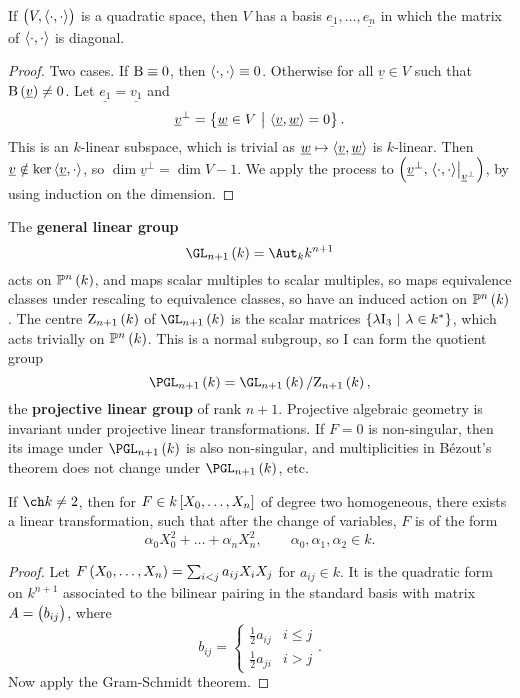 \begin{theorem}
If $ \br{V, \abr{\cdot, \cdot}} $ is a quadratic space, then $ V $ has a basis $ \underline{e_1}, \dots, \underline{e_n} $ in which the matrix of $ \left\langle \cdot, \cdot \right\rangle $ is diagonal.
\end{theorem}

\begin{proof}
Two cases. If $ \mathrm{B} \equiv 0 $, then $ \left\langle \cdot, \cdot \right\rangle \equiv 0 $. Otherwise for all $ \underline{v} \in V $ such that $ \B\br{\underline{v}} \ne 0 $. Let $ \underline{e_1} = \underline{v_1} $ and
$$ \underline{v}^\perp = \cbr{\underline{w} \in V \st \abr{\underline{v}, \underline{w}} = 0}. $$
This is an $ k $-linear subspace, which is trivial as $ \underline{w} \mapsto \left\langle \underline{v}, \underline{w} \right\rangle $ is $ k $-linear. Then $ \underline{v} \notin \ker \left\langle \underline{v}, \cdot \right\rangle $, so $ \dim \underline{v}^\perp = \dim V - 1 $. We apply the process to $ \br{\underline{v}^\perp, \eval{\abr{\cdot, \cdot}}_{\underline{v}^\perp}} $, by using induction on the dimension.
\end{proof}

\pagebreak

\begin{remark}
The \textbf{general linear group}
$$ \GL_{n + 1}\br{k} = \Aut_k k^{n + 1} $$
acts on $ \PP^n\br{k} $, and maps scalar multiples to scalar multiples, so maps equivalence classes under rescaling to equivalence classes, so have an induced action on $ \PP^n\br{k} $. The centre $ \Z_{n + 1}\br{k} $ of $ \GL_{n + 1}\br{k} $ is the scalar matrices $ \cbr{\lambda \I_3 \st \lambda \in k^*} $, which acts trivially on $ \PP^n\br{k} $. This is a normal subgroup, so I can form the quotient group
$$ \PGL_{n + 1}\br{k} = \GL_{n + 1}\br{k} / \Z_{n + 1}\br{k}, $$
the \textbf{projective linear group} of rank $ n + 1 $. Projective algebraic geometry is invariant under projective linear transformations. If $ F = 0 $ is non-singular, then its image under $ \PGL_{n + 1}\br{k} $ is also non-singular, and multiplicities in B\'ezout's theorem does not change under $ \PGL_{n + 1}\br{k} $, etc.
\end{remark}

\begin{theorem}
If $ \ch k \ne 2 $, then for $ F \in k\sbr{X_0, \dots, X_n} $ of degree two homogeneous, there exists a linear transformation, such that after the change of variables, $ F $ is of the form
$$ \alpha_0X_0^2 + \dots + \alpha_nX_n^2, \qquad \alpha_0, \alpha_1, \alpha_2 \in k. $$
\end{theorem}

\begin{proof}
Let $ F\br{X_0, \dots, X_n} = \sum_{i < j} a_{ij}X_iX_j $ for $ a_{ij} \in k $. It is the quadratic form on $ k^{n + 1} $ associated to the bilinear pairing in the standard basis with matrix $ A = \br{b_{ij}} $, where
$$ b_{ij} =
\begin{cases}
\tfrac{1}{2}a_{ij} & i \le j \\
\tfrac{1}{2}a_{ji} & i > j
\end{cases}.
$$
Now apply the Gram-Schmidt theorem.
\end{proof}

